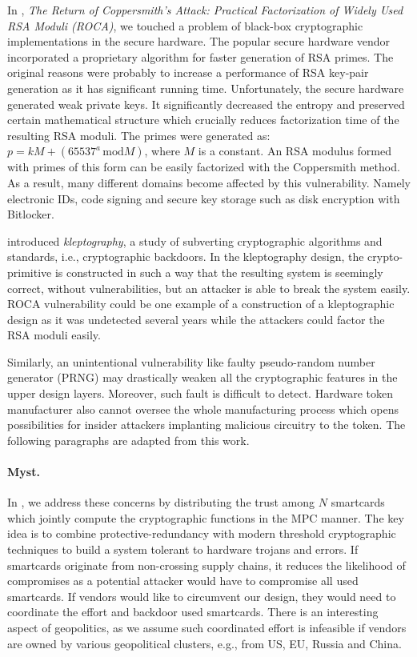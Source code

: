 \documentclass[
  digital, %
  twoside, %
  table,   %
  lof,     %
  lot,     %
]{fithesis3}
\theoremstyle{definition}
\theoremstyle{remark}
\begin{document}
In \cite{2017-ccs-nemec}, \emph{The Return of Coppersmith's Attack: Practical Factorization of Widely Used RSA Moduli (ROCA)}, we touched a problem of black-box cryptographic implementations in the secure hardware. The popular secure hardware vendor incorporated a proprietary algorithm for faster generation of RSA primes. The original reasons were probably to increase a performance of RSA key-pair generation as it has significant running time. Unfortunately, the secure hardware generated weak private keys. It significantly decreased the entropy and preserved certain mathematical structure which crucially reduces factorization time of the resulting RSA moduli. The primes were generated as: $p = kM + (65537^a \,\text{mod} M)$, where $M$ is a constant. An RSA modulus formed with primes of this form can be easily factorized with the Coppersmith method.
As a result, many different domains become affected by this vulnerability. Namely electronic IDs, code signing and secure key storage such as disk encryption with Bitlocker.

\cite{Young:1996:DSB:646761.706030} introduced \emph{kleptography}, a study of subverting cryptographic algorithms and standards, i.e., cryptographic backdoors. In the kleptography design, the crypto-primitive is constructed in such a way that the resulting system is seemingly correct, without vulnerabilities, but an attacker is able to break the system easily. ROCA vulnerability could be one example of a construction of a kleptographic design as it was undetected several years while the attackers could factor the RSA moduli easily.

Similarly, an unintentional vulnerability like faulty pseudo-random number generator (PRNG) may drastically weaken all the cryptographic features in the upper design layers. Moreover, such fault is difficult to detect. 
Hardware token manufacturer also cannot oversee the whole manufacturing process which opens possibilities for insider attackers implanting malicious circuitry to the token. 
%
The following paragraphs are adapted from this work.%

\paragraph{Myst.}%
In \cite{2017-ccs-mavroudis}, we address these concerns by distributing the trust among $N$ smartcards which jointly compute the cryptographic functions in the MPC manner. 
The key idea is to combine
protective-redundancy with modern threshold cryptographic techniques to build a system tolerant to hardware trojans and errors. 
If smartcards originate from non-crossing supply chains, it reduces the likelihood of compromises as a potential attacker would have to compromise all used smartcards. 
If vendors would like to circumvent our design, they would need to coordinate the effort and backdoor used smartcards. There is an interesting aspect of geopolitics, as we assume such coordinated effort is infeasible if vendors are owned by various geopolitical clusters, e.g., from US, EU, Russia and China.
\end{document}
